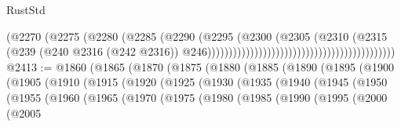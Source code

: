 \begin{lexlean}{RustStd}
\begin{coremodule}
{\begin{coremodule}
{{{{{{{{{{{{{{{{{{{{{{{{{{{{{{{{{{{{{{{{{{{{{{{{{{{{{{{{{{{{                                                                      (@2270
                                                                        (@2275
                                                                          (@2280
                                                                            (@2285
                                                                              (@2290
                                                                                (@2295
                                                                                  (@2300
                                                                                    (@2305
                                                                                      (@2310
                                                                                        (@2315
                                                                                          (@239
                                                                                            (@240
                                                                                              @2316
                                                                                              (@242
                                                                                                @2316))
                                                                                            @246))))))))))))))))))))))))))))))))))))))))))))
@2413 := @1860
    (@1865
      (@1870
        (@1875
          (@1880
            (@1885
              (@1890
                (@1895
                  (@1900
                    (@1905
                      (@1910
                        (@1915
                          (@1920
                            (@1925
                              (@1930
                                (@1935
                                  (@1940
                                    (@1945
                                      (@1950
                                        (@1955
                                          (@1960
                                            (@1965
                                              (@1970
                                                (@1975
                                                  (@1980
                                                    (@1985
                                                      (@1990
                                                        (@1995
                                                          (@2000
                                                            (@2005
}}}}}}}}}}}}}}}}}}}}}}}}}}}}}}}}}}}}}}}}}}}}}}}}}}}}}}}}}}}}
\end{coremodule}}
\end{coremodule}
\end{lexlean}
